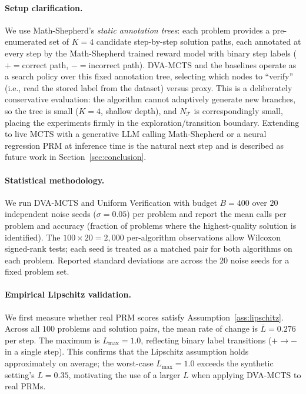 \paragraph{Setup clarification.}
We use Math-Shepherd's \emph{static annotation trees}: each problem provides a
pre-enumerated set of $K{=}4$ candidate step-by-step solution paths, each annotated
at every step by the Math-Shepherd trained reward model with binary step labels
($+{=}$correct path, $-{=}$incorrect path).  DVA-MCTS and the baselines operate
as a search policy over this fixed annotation tree, selecting which nodes to
``verify'' (i.e., read the stored label from the dataset) versus proxy.
This is a deliberately conservative evaluation: the algorithm cannot adaptively
generate new branches, so the tree is small ($K{=}4$, shallow depth), and
$N_{\mathcal{T}}$ is correspondingly small, placing the experiments firmly in the
exploration/transition boundary.  Extending to live MCTS with a generative LLM
calling Math-Shepherd or a neural regression PRM at inference time is the natural
next step and is described as future work in Section~\ref{sec:conclusion}.

\paragraph{Statistical methodology.}
We run DVA-MCTS and Uniform Verification with budget $B{=}400$ over $20$ independent
noise seeds ($\sigma{=}0.05$) per problem and report the mean calls per problem and
accuracy (fraction of problems where the highest-quality solution is identified).
The $100 \times 20 = 2{,}000$ per-algorithm observations allow Wilcoxon signed-rank
tests; each seed is treated as a matched pair for both algorithms on each problem.
Reported standard deviations are across the $20$ noise seeds for a fixed problem set.

\paragraph{Empirical Lipschitz validation.}
We first measure whether real PRM scores satisfy Assumption~\ref{ass:lipschitz}.
Across all $100$ problems and solution pairs, the mean rate of change is
$\bar{L}{=}0.276$ per step. The maximum is $L_{\max}{=}1.0$, reflecting binary
label transitions ($+{\to}-$ in a single step). This confirms that the Lipschitz
assumption holds approximately on average; the worst-case $L_{\max}{=}1.0$
exceeds the synthetic setting's $L{=}0.35$, motivating the use of a larger $L$
when applying DVA-MCTS to real PRMs.

